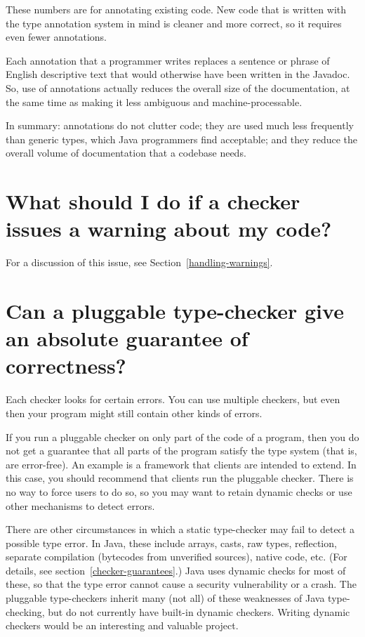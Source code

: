 These numbers are for annotating existing code.  New code that
is written with the type annotation system in mind is cleaner and more
correct, so it requires even fewer annotations.

Each annotation that a programmer writes replaces a sentence or phrase of
English descriptive text that would otherwise have been written in the
Javadoc.  So, use of annotations actually reduces the overall size of the
documentation, at the same time as making it less ambiguous and
machine-processable.

In summary:  annotations do not clutter code; they are used much
less frequently than generic types, which Java programmers find acceptable;
and they reduce the overall volume of documentation that a codebase needs.


\section{What should I do if a checker issues a warning about my code?\label{faq-handling-warnings}}

For a discussion of this issue, see Section~\ref{handling-warnings}.


\section{Can a pluggable type-checker give an absolute guarantee of correctness?\label{faq-no-absolute-guarantee}}

Each checker looks for certain errors.  You can use multiple checkers, but
even then your program might still contain other kinds of errors.

If you run a pluggable checker on only part of the code of a program, then
you do not get a guarantee that all parts of the program satisfy the type
system (that is, are error-free).  An example is a framework that clients
are intended to extend.  In this case, you should recommend that clients
run the pluggable checker.  There is no way to force users to do so, so you
may want to retain dynamic checks or use other mechanisms to detect errors.

There are other circumstances in which a static type-checker may fail to
detect a possible type error.  In Java, these include arrays, casts, raw
types, reflection, separate compilation (bytecodes from unverified sources),
native code, etc.  (For details, see section~\ref{checker-guarantees}.)
Java uses dynamic checks for most of these, so that the
type error cannot cause a security vulnerability or a crash.  The pluggable
type-checkers inherit many (not all) of these weaknesses of Java
type-checking, but do not currently have built-in dynamic checkers.
Writing dynamic checkers would be an interesting and valuable project.

